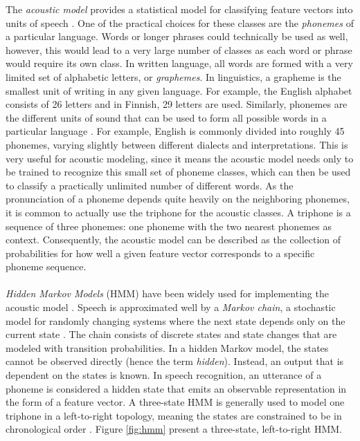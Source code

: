 \documentclass[english, 12pt, a4paper, pdftex, elec, utf8]{aaltothesis}
\begin{document}
The \textit{acoustic model} provides a statistical model for classifying feature vectors into units of speech \cite{kallasjoki2016}. One of the practical choices for these classes are the \textit{phonemes} of a particular language. Words or longer phrases could technically be used as well, however, this would lead to a very large number of classes as each word or phrase would require its own class. In written language, all words are formed with a very limited set of alphabetic letters, or \textit{graphemes}. In linguistics, a grapheme is the smallest unit of writing in any given language. For example, the English alphabet consists of 26 letters and in Finnish, 29 letters are used. Similarly, phonemes are the different units of sound that can be used to form all possible words in a particular language \cite[p.~24--25]{huang2001spoken}. For example, English is commonly divided into roughly 45 phonemes, varying slightly between different dialects and interpretations. This is very useful for acoustic modeling, since it means the acoustic model needs only to be trained to recognize this small set of phoneme classes, which can then be used to classify a practically unlimited number of different words. As the pronunciation of a phoneme depends quite heavily on the neighboring phonemes, it is common to actually use the triphone for the acoustic classes. A triphone is a sequence of three phonemes: one phoneme with the two nearest phonemes as context. Consequently, the acoustic model can be described as the collection of probabilities for how well a given feature vector corresponds to a specific phoneme sequence. \\\\
\textit{Hidden Markov Models} (HMM) have been widely used for implementing the acoustic model \cite{gales2008application, hori2013speech}. Speech is approximated well by a \textit{Markov chain}, a stochastic model for randomly changing systems where the next state depends only on the current state \cite[p.~23--26]{yu2014automatic}. The chain consists of discrete states and state changes that are modeled with transition probabilities. In a hidden Markov model, the states cannot be observed directly (hence the term \textit{hidden}). Instead, an output that is dependent on the states is known. In speech recognition, an utterance of a phoneme is considered a hidden state that emits an observable representation in the form of a feature vector. A three-state HMM is generally used to model one triphone in a left-to-right topology, meaning the states are constrained to be in chronological order \cite{kallasjoki2016}. Figure \ref{fig:hmm} present a three-state, left-to-right HMM.
\end{document}
